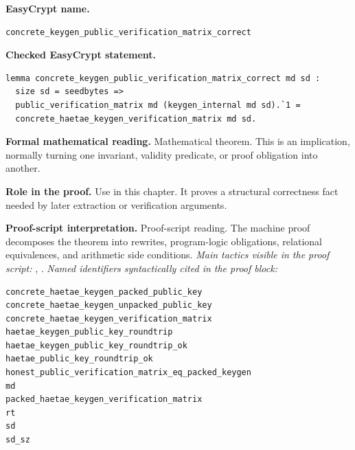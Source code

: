 \begin{formaltheorem}
\noindent\textbf{EasyCrypt name.}
\begin{lstlisting}[language=EasyCrypt,basicstyle=\ttfamily\scriptsize]
concrete_keygen_public_verification_matrix_correct
\end{lstlisting}
\noindent\textbf{Checked EasyCrypt statement.}
\begin{lstlisting}[language=EasyCrypt,basicstyle=\ttfamily\scriptsize]
lemma concrete_keygen_public_verification_matrix_correct md sd :
  size sd = seedbytes =>
  public_verification_matrix md (keygen_internal md sd).`1 =
  concrete_haetae_keygen_verification_matrix md sd.
\end{lstlisting}
\noindent\textbf{Formal mathematical reading.}
Mathematical theorem. This is an implication, normally turning one invariant, validity predicate, or proof obligation into another.

\noindent\textbf{Role in the proof.}
Use in this chapter. It proves a structural correctness fact needed by later extraction or verification arguments.

\noindent\textbf{Proof-script interpretation.}
Proof-script reading. The machine proof decomposes the theorem into rewrites, program-logic obligations, relational equivalences, and arithmetic side conditions.
\emph{Main tactics visible in the proof script:} , .
\emph{Named identifiers syntactically cited in the proof block:}
\begin{lstlisting}[language=EasyCrypt,basicstyle=\ttfamily\scriptsize]
concrete_haetae_keygen_packed_public_key
concrete_haetae_keygen_unpacked_public_key
concrete_haetae_keygen_verification_matrix
haetae_keygen_public_key_roundtrip
haetae_keygen_public_key_roundtrip_ok
haetae_public_key_roundtrip_ok
honest_public_verification_matrix_eq_packed_keygen
md
packed_haetae_keygen_verification_matrix
rt
sd
sd_sz
\end{lstlisting}

\end{formaltheorem}

